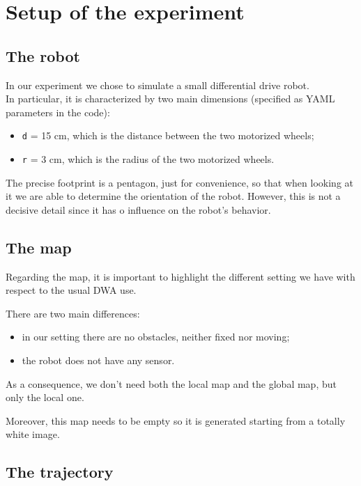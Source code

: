 \documentclass[11pt,a4paper]{article}
\begin{document}
\section{Setup of the experiment}

\subsection{The robot}

In our experiment we chose to simulate a small differential drive robot.\\

In particular, it is characterized by two main dimensions (specified as YAML parameters in the code):
\begin{itemize}
 \item \texttt{d} = 15 cm, which is the distance between the two motorized wheels;
 \item \texttt{r} = 3 cm, which is the radius of the two motorized wheels.\\
\end{itemize}

The precise footprint is a pentagon, just for convenience, so that when looking at it we are able to determine the orientation of the robot.
However, this is not a decisive detail since it has o influence on the robot's behavior.


\subsection{The map}

Regarding the map, it is important to highlight the different setting we have with respect to the usual DWA use.

There are two main differences:
\begin{itemize}
 \item in our setting there are no obstacles, neither fixed nor moving;
 \item the robot does not have any sensor.\\
\end{itemize}

As a consequence, we don't need both the local map and the global map, but only the local one.

Moreover, this map needs to be empty so it is generated starting from a totally white image.


\subsection{The trajectory}
\end{document}
